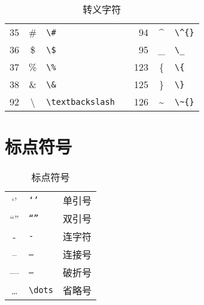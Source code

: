 \begin{table}[h]
\caption{转义字符}
\begin{center}
\begin{tabular}{r c p{15ex} p{5ex} r c p{15ex}}
	\hline
	 35 & \#             & \texttt{\textbackslash \#}            &&  94 & \^{}           & \texttt{\textbackslash \^{}\{\}}      \\
	 36 & \$             & \texttt{\textbackslash \$}            &&  95 & \_             & \texttt{\textbackslash \_}            \\
	 37 & \%             & \texttt{\textbackslash \%}            && 123 & \{             & \texttt{\textbackslash \{}            \\
	 38 & \&             & \texttt{\textbackslash \&}            && 125 & \}             & \texttt{\textbackslash \}}            \\
	 92 & \textbackslash & \texttt{\textbackslash textbackslash} && 126 & \~{}           & \texttt{\textbackslash \~{}\{\}}      \\
	\hline
\end{tabular}
\end{center}
\end{table}

\section{标点符号}

\begin{table}[h]
\caption{标点符号}
\begin{center}
\begin{tabular}{c l l}
	\hline
	`'    & \texttt{`'}                  & 单引号 \\
	``''  & \texttt{``''}                & 双引号 \\
	-     & \texttt{-}                   & 连字符 \\
	--    & \texttt{--}                  & 连接号 \\
	---   & \texttt{---}                 & 破折号 \\
	\dots & \texttt{\textbackslash dots} & 省略号 \\
	\hline
\end{tabular}
\end{center}
\end{table}

